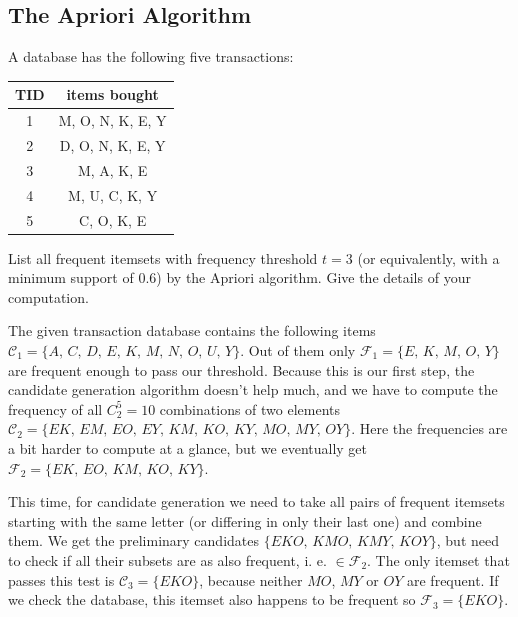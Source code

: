 \documentclass{article}
\begin{document}
  \subsection{The Apriori Algorithm}
  \begin{centerframebox}
    A database has the following five transactions:

    \begin{center}
      \begin{tabular}{|c|c|}
        \hline
        TID & items bought \\ \hline
        1 & M, O, N, K, E, Y \\ \hline
        2 & D, O, N, K, E, Y \\ \hline
        3 & M, A, K, E \\ \hline
        4 & M, U, C, K, Y \\ \hline
        5 & C, O, K, E \\ \hline
      \end{tabular}
    \end{center}

    List all frequent itemsets with frequency threshold $t = 3$ (or equivalently, with
    a minimum support of $0.6$) by the Apriori algorithm. Give the details of your
    computation.
  \end{centerframebox}
  The given transaction database contains the following items $\mathcal{C}_1 = \{A,\, C,\, D,\, E,\, K,\, M,\, N,\, O,\, U,\, Y\}$.
  Out of them only $\mathcal{F}_1 = \{E,\, K,\, M,\, O,\, Y\}$ are frequent enough to pass our threshold.
  Because this is our first step, the candidate generation algorithm doesn't help much,
  and we have to compute the frequency of all $C^5_2 = 10$ combinations of two elements
  $\mathcal{C}_2 = \{EK,\, EM,\, EO,\, EY,\, KM,\, KO,\, KY,\, MO,\, MY,\, OY\}$.
  Here the frequencies are a bit harder to compute at a glance, but we eventually get
  $\mathcal{F}_2 = \{EK,\, EO,\, KM,\, KO,\, KY\}$.

  This time, for candidate generation we need to take all pairs of frequent itemsets starting with the same letter
  (or differing in only their last one) and combine them.
  We get the preliminary candidates $\{EKO,\, KMO,\, KMY,\, KOY\}$,
  but need to check if all their subsets are as also frequent, i. e. $\in \mathcal{F}_2$.
  The only itemset that passes this test is $\mathcal{C}_3 = \{EKO\}$, because neither $MO$, $MY$ or $OY$ are frequent.
  If we check the database, this itemset also happens to be frequent so $\mathcal{F}_3 = \{EKO\}$.
\end{document}
